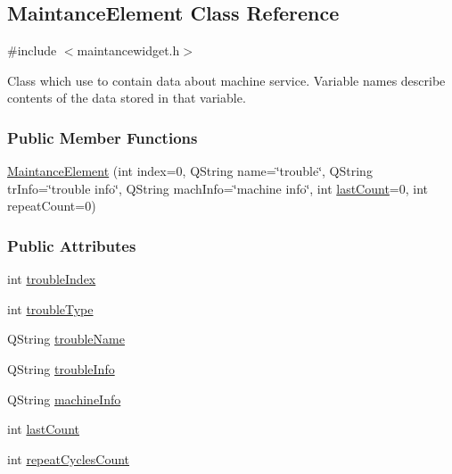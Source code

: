 \hypertarget{classMaintanceElement}{}\subsection{Maintance\+Element Class Reference}
\label{classMaintanceElement}


{\ttfamily \#include $<$maintancewidget.\+h$>$}

Class which use to contain data about machine service. Variable names describe contents of the data stored in that variable. 

\subsubsection*{Public Member Functions}
\begin{DoxyCompactItemize}
\item 
\mbox{\hyperlink{classMaintanceElement_a25309cc801745cc150d9699b479a57ec}{Maintance\+Element}} (int index=0, Q\+String name=\char`\"{}trouble\char`\"{}, Q\+String tr\+Info=\char`\"{}trouble info\char`\"{}, Q\+String mach\+Info=\char`\"{}machine info\char`\"{}, int \mbox{\hyperlink{classMaintanceElement_a8f77271e8f3895e9b48094b12e3863cf}{last\+Count}}=0, int repeat\+Count=0)
\end{DoxyCompactItemize}
\subsubsection*{Public Attributes}
\begin{DoxyCompactItemize}
\item 
int \mbox{\hyperlink{classMaintanceElement_a5afec369512aad3a7b50a0e2f4d5aec2}{trouble\+Index}}
\item 
int \mbox{\hyperlink{classMaintanceElement_aec00a58cacb8c3b10e0d1fd253e189c4}{trouble\+Type}}
\item 
Q\+String \mbox{\hyperlink{classMaintanceElement_a27d8b4968e337c674e543699912c8f08}{trouble\+Name}}
\item 
Q\+String \mbox{\hyperlink{classMaintanceElement_af44ea0cae71dbad873777464b8440f78}{trouble\+Info}}
\item 
Q\+String \mbox{\hyperlink{classMaintanceElement_a31458d0dace2255d1e0a613e27cdc583}{machine\+Info}}
\item 
int \mbox{\hyperlink{classMaintanceElement_a8f77271e8f3895e9b48094b12e3863cf}{last\+Count}}
\item 
int \mbox{\hyperlink{classMaintanceElement_a6c818663317a6b1842c5cb275495304f}{repeat\+Cycles\+Count}}
\end{DoxyCompactItemize}


